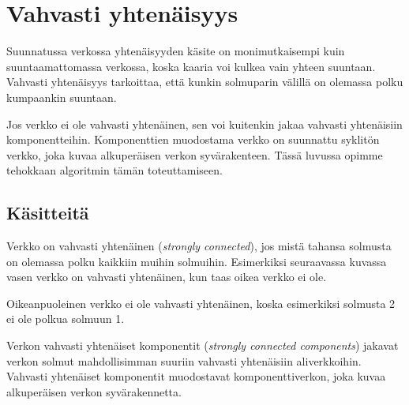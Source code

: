 \chapter{Vahvasti yhtenäisyys}

Suunnatussa verkossa yhtenäisyyden
käsite on monimutkaisempi
kuin suuntaamattomassa verkossa,
koska kaaria voi kulkea vain yhteen suuntaan.
Vahvasti yhtenäisyys tarkoittaa,
että kunkin solmuparin välillä on
olemassa polku kumpaankin suuntaan.

Jos verkko ei ole vahvasti yhtenäinen,
sen voi kuitenkin jakaa vahvasti yhtenäisiin
komponentteihin. Komponenttien muodostama
verkko on suunnattu syklitön verkko,
joka kuvaa alkuperäisen verkon syvärakenteen.
Tässä luvussa opimme tehokkaan algoritmin tämän
toteuttamiseen.

\section{Käsitteitä}

Verkko on vahvasti yhtenäinen
(\textit{strongly connected}),
jos mistä tahansa solmusta on olemassa polku
kaikkiin muihin solmuihin.
Esimerkiksi seuraavassa kuvassa vasen
verkko on vahvasti yhtenäinen,
kun taas oikea verkko ei ole.

\begin{center}
\end{center}

Oikeanpuoleinen verkko ei ole vahvasti yhtenäinen,
koska esimerkiksi solmusta 2 ei ole
polkua solmuun 1.

Verkon vahvasti yhtenäiset komponentit
(\textit{strongly connected components})
jakavat verkon solmut mahdollisimman
suuriin vahvasti yhtenäisiin aliverkkoihin.
Vahvasti yhtenäiset komponentit
muodostavat komponenttiverkon,
joka kuvaa alkuperäisen verkon syvärakennetta.

